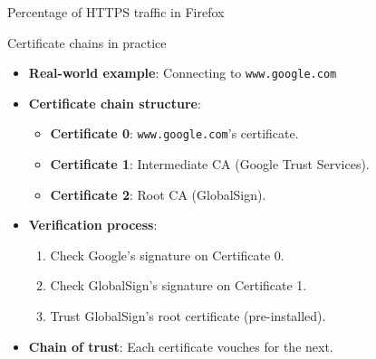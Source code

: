 \documentclass[aspectratio=169, lualatex, handout]{beamer}
\begin{document}
\begin{frame}{Percentage of HTTPS traffic in Firefox}
\end{frame}

\begin{frame}{Certificate chains in practice}
	\begin{itemize}[<+->]
		\item \textbf{Real-world example}: Connecting to \texttt{www.google.com}
		\item \textbf{Certificate chain structure}:
		      \begin{itemize}
			      \item \textbf{Certificate 0}: \texttt{www.google.com}'s certificate.
			      \item \textbf{Certificate 1}: Intermediate CA (Google Trust Services).
			      \item \textbf{Certificate 2}: Root CA (GlobalSign).
		      \end{itemize}
		\item \textbf{Verification process}:
		      \begin{enumerate}
			      \item Check Google's signature on Certificate 0.
			      \item Check GlobalSign's signature on Certificate 1.
			      \item Trust GlobalSign's root certificate (pre-installed).
		      \end{enumerate}
		\item \textbf{Chain of trust}: Each certificate vouches for the next.
	\end{itemize}
\end{frame}
\end{document}

